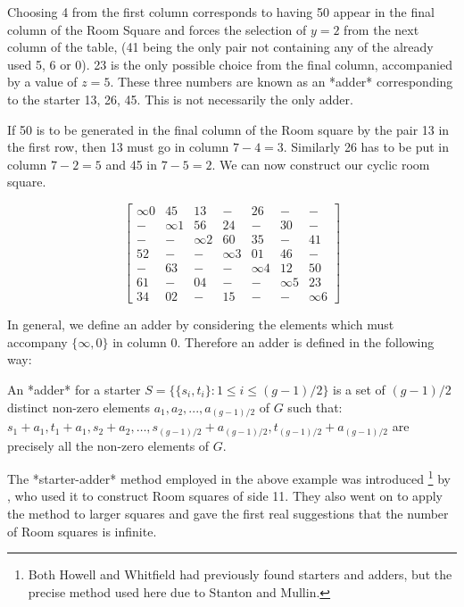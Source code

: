 \documentclass[11pt, a4paper]{book}\usepackage[]{graphicx}\usepackage[]{xcolor}
\newcounter{example}
\begin{document}
Choosing 4 from the first column corresponds to having 50
appear in the final column of the Room Square and forces the
selection of $y = 2$ from the next column of the table, (41
being the only pair not containing any of the already used
5, 6 or 0). 23 is the only possible choice from the final
column, accompanied by a value of $z = 5$. These three
numbers are known as an *adder* corresponding to the starter
13, 26, 45. This is not necessarily the only adder.

If 50 is to be generated in the final column of the Room
square by the pair 13 in the first row, then 13 must go in
column $7 - 4 = 3$. Similarly 26 has to be put in column
$7 - 2 = 5$ and 45 in $7 - 5 = 2$.  We can now construct our
cyclic room square.

\begin{equation}
  \begin{bmatrix}
    \infty 0 &  45 &  13 &   - &  26 &   - &   - \\
     - &  \infty 1 &  56 &  24 &   - &  30 &   - \\
     - &   - &  \infty 2 &  60 &  35 &   - &  41 \\
    52 &   - &   - &  \infty 3 &  01 &  46 &   - \\
     - &  63 &   - &   - &  \infty 4 &  12 &  50 \\
    61 &   - &  04 &   - &   - &  \infty 5 &  23 \\
    34 &  02 &   - &  15 &   - &   - &  \infty 6 
  \end{bmatrix}
  \label{eq:cyclic-room}
\end{equation}

In general, we define an adder by considering the elements
which must accompany $\{\infty, 0\}$ in column 0. Therefore
an adder is defined in the following way:

An *adder* for a starter
$S = \{\{s_i, t_i\}: 1 \leq i \leq (g - 1)/2 \}$
is a set of $(g - 1)/2$ distinct non-zero elements
$a_1, a_2, ..., a_{(g - 1)/2}$ of $G$ such that:
$s_1 + a_1, t_1 + a_1, s_2 + a_2, \ldots, s_{(g - 1)/2} + a_{(g - 1)/2}, t_{(g - 1)/2} + a_{(g - 1)/2}$
are precisely all the non-zero elements of $G$.

The *starter-adder* method employed in the above example was
introduced
\footnote{Both Howell and Whitfield had previously found starters and adders, but the precise method used here due to Stanton and Mullin.}
by
\cite{stantonConstructionRoomSquares1968},
who used it to construct Room squares of side 11.
They also went on to apply the method to larger squares and
gave the first real suggestions that the number of Room squares
is infinite.
\end{document}
